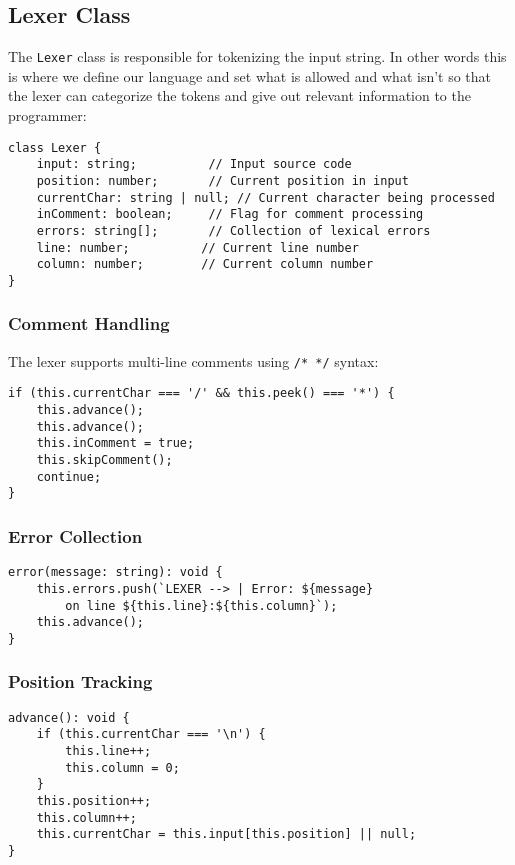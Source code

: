 \documentclass[12pt]{article}
\begin{document}
\subsection{Lexer Class}
The \texttt{Lexer} class is responsible for tokenizing the input string. In other words this is where we define our language and set what is allowed and what isn't so that the lexer can categorize the tokens and give out relevant information to the programmer:

\begin{lstlisting}
class Lexer {
    input: string;          // Input source code
    position: number;       // Current position in input
    currentChar: string | null; // Current character being processed
    inComment: boolean;     // Flag for comment processing
    errors: string[];       // Collection of lexical errors
    line: number;          // Current line number
    column: number;        // Current column number
}
\end{lstlisting}



\subsubsection{Comment Handling}
The lexer supports multi-line comments using \texttt{/* */} syntax:

\begin{lstlisting}
if (this.currentChar === '/' && this.peek() === '*') {
    this.advance();
    this.advance();
    this.inComment = true;
    this.skipComment();
    continue;
}
\end{lstlisting}

\subsubsection{Error Collection}
\begin{lstlisting}
error(message: string): void {
    this.errors.push(`LEXER --> | Error: ${message} 
        on line ${this.line}:${this.column}`);
    this.advance();
}
\end{lstlisting}

\subsubsection{Position Tracking}
\begin{lstlisting}
advance(): void {
    if (this.currentChar === '\n') {
        this.line++;
        this.column = 0;
    }
    this.position++;
    this.column++;
    this.currentChar = this.input[this.position] || null;
}
\end{lstlisting}
\end{document}
